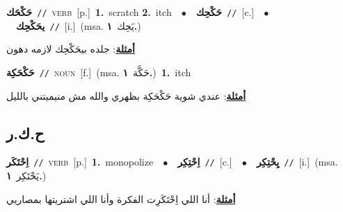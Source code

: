 \documentclass[10pt,a4paper,twoside]{article} %
\begin{document}
\begin{multicols}{2}
{\setlength\topsep{0pt}\textbf{\foreignlanguage{arabic}{حَكْحَك}}\ {\color{gray}\texttt{//}\color{black}}\ \textsc{verb}\ [p.]\ \textbf{1.}~scratch  \textbf{2.}~itch\ \ $\bullet$\ \ \setlength\topsep{0pt}\textbf{\foreignlanguage{arabic}{حَكْحِك}}\ {\color{gray}\texttt{//}\color{black}}\ [c.]\ \ $\bullet$\ \ \setlength\topsep{0pt}\textbf{\foreignlanguage{arabic}{يحَكْحِك}}\ {\color{gray}\texttt{//}\color{black}}\ [i.]\ \color{gray}(msa. \foreignlanguage{arabic}{يَحِك}~\foreignlanguage{arabic}{\textbf{١.}})\color{black}\  \begin{flushright}\color{gray}\foreignlanguage{arabic}{\textbf{\underline{\foreignlanguage{arabic}{أمثلة}}}: جلده بيحَكْحِك لازمه دهون}\end{flushright}\color{black}} \vspace{2mm}

{\setlength\topsep{0pt}\textbf{\foreignlanguage{arabic}{حَكْحَكِة}}\ {\color{gray}\texttt{//}\color{black}}\ \textsc{noun}\ [f.]\ \color{gray}(msa. \foreignlanguage{arabic}{حَكَّة}~\foreignlanguage{arabic}{\textbf{١.}})\color{black}\ \textbf{1.}~itch\  \begin{flushright}\color{gray}\foreignlanguage{arabic}{\textbf{\underline{\foreignlanguage{arabic}{أمثلة}}}: عندي شوية حَكْحَكِة بظهري والله مش منيميتني بالليل}\end{flushright}\color{black}} \vspace{2mm}

\vspace{-3mm}
\subsection*{\color{blue}\foreignlanguage{arabic}{ح.ك.ر}\color{blue}{}} 

{\setlength\topsep{0pt}\textbf{\foreignlanguage{arabic}{اِحْتَكَر}}\ {\color{gray}\texttt{//}\color{black}}\ \textsc{verb}\ [p.]\ \textbf{1.}~monopolize\ \ $\bullet$\ \ \setlength\topsep{0pt}\textbf{\foreignlanguage{arabic}{اِحْتِكِر}}\ {\color{gray}\texttt{//}\color{black}}\ [c.]\ \ $\bullet$\ \ \setlength\topsep{0pt}\textbf{\foreignlanguage{arabic}{يِحْتِكِر}}\ {\color{gray}\texttt{//}\color{black}}\ [i.]\ \color{gray}(msa. \foreignlanguage{arabic}{يَحْتَكِر}~\foreignlanguage{arabic}{\textbf{١.}})\color{black}\  \begin{flushright}\color{gray}\foreignlanguage{arabic}{\textbf{\underline{\foreignlanguage{arabic}{أمثلة}}}: أنا اللي اِحْتَكَرِت الفكرة وأنا اللي اشتريتها بمصاريي}\end{flushright}\color{black}} \vspace{2mm}


\end{multicols}
\end{document}
